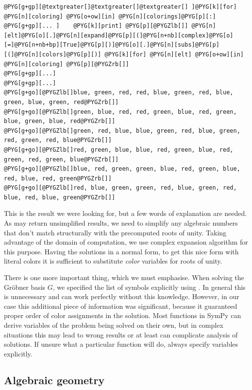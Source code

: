 \begin{Verbatim}[commandchars=@\[\]]
@PYG[g+gp][@textgreater[]@textgreater[]@textgreater[] ]@PYG[k][for] @PYG[n][coloring] @PYG[o+ow][in] @PYG[n][colorings]@PYG[p][:]
@PYG[g+gp][... ]    @PYG[k][print] @PYG[p][@PYGZlb[]] @PYG[n][elt]@PYG[o][.]@PYG[n][expand]@PYG[p][(]@PYG[n+nb][complex]@PYG[o][=]@PYG[n+nb+bp][True]@PYG[p][)]@PYG[o][.]@PYG[n][subs]@PYG[p][(]@PYG[n][colors]@PYG[p][)] @PYG[k][for] @PYG[n][elt] @PYG[o+ow][in] @PYG[n][coloring] @PYG[p][@PYGZrb[]]
@PYG[g+gp][...]
@PYG[g+gp][...]
@PYG[g+go][@PYGZlb[]blue, green, red, red, blue, green, red, blue, green, blue, green, red@PYGZrb[]]
@PYG[g+go][@PYGZlb[]green, blue, red, red, green, blue, red, green, blue, green, blue, red@PYGZrb[]]
@PYG[g+go][@PYGZlb[]green, red, blue, blue, green, red, blue, green, red, green, red, blue@PYGZrb[]]
@PYG[g+go][@PYGZlb[]red, green, blue, blue, red, green, blue, red, green, red, green, blue@PYGZrb[]]
@PYG[g+go][@PYGZlb[]blue, red, green, green, blue, red, green, blue, red, blue, red, green@PYGZrb[]]
@PYG[g+go][@PYGZlb[]red, blue, green, green, red, blue, green, red, blue, red, blue, green@PYGZrb[]]
\end{Verbatim}
\noindent
This is the result we were looking for, but a few words of explanation are needed. As  may
return unsimplified results, we need to simplify any algebraic numbers that don't match structurally with
the precomputed roots of unity. Taking advantage of the domain of computation, we use complex expansion
algorithm for this purpose. Having the solutions in a normal form, to get this nice form with literal
colors it is sufficient to substitute \emph{color} variables for roots of unity.

There is one more important thing, which we must emphasise. When solving the Gröbner basis $G$, we
specified the list of symbols explicitly using . In general this is unnecessary and 
can work perfectly without this knowledge. However, in our case this additional piece of information
was significant, because it guaranteed proper order of color assignments in the solution. Most functions
in SymPy can derive variables of the problem being solved on their own, but in complex situations this
may lead to wrong results or at least can complicate analysis of solutions. If unsure what a particular
function will do, always specify variables explicitly.


\subsection{Algebraic geometry}

